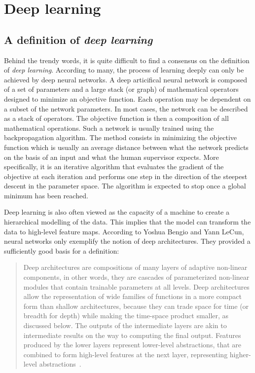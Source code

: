 \section{Deep learning}

    \subsection{A definition of \textit{deep learning}}

        Behind the trendy words, it is quite difficult to find a consensus on the definition of \textit{deep learning}.
        According to many, the process of learning 
        deeply can only be achieved by deep neural networks. A deep articifical neural network is composed of a set of parameters and a large stack 
        (or graph) of mathematical operators designed to minimize an objective function.
        Each operation may be dependent on a subset of the network parameters.
        In most cases, the network can be described as a stack of operators. 
        The objective function is then a composition of all mathematical operations. Such a network is usually trained using the 
        backpropagation algorithm. The method consists in minimizing the objective function which is usually an average distance between what the network
        predicts on the basis of an input and what the human supervisor expects. More specifically, it is an iterative algorithm that evaluates the gradient of the 
        objective at each iteration and performs one step in the direction of the steepest descent in the parameter space. The algorithm is expected to stop
        once a global minimum has been reached.

        Deep learning is also often viewed as the capacity of a machine to create a hierarchical modelling of the data.
        This implies that the model can transform the data to high-level feature maps.
        According to Yoshua Bengio and Yann LeCun, neural networks only exemplify the notion of deep
        architectures. They provided a sufficiently good basis for a definition:

        \begin{quotation}
            Deep architectures are compositions of many layers of adaptive non-linear components,
            in other words, they are cascades of parameterized non-linear modules that contain
            trainable parameters at all levels. Deep architectures allow the representation of wide
            families of functions in a more compact form than shallow architectures, because they
            can trade space for time (or breadth for depth) while making the time-space product
            smaller, as discussed below. The outputs of the intermediate layers are akin to intermediate
            results on the way to computing the final output. Features produced by the lower
            layers represent lower-level abstractions, that are combined to form high-level features
            at the next layer, representing higher-level abstractions~\cite{40d5d7fd62cb44ba934a8a75d4b2b076}.
        \end{quotation}

